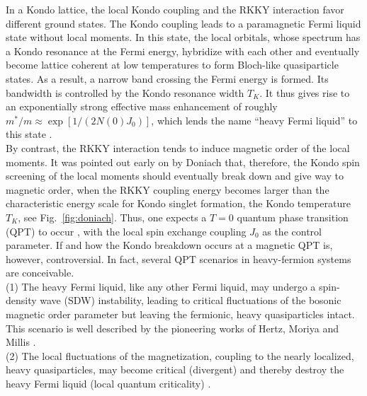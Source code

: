 \documentclass[12pt,twoside]{article}
\begin{document}
In a Kondo lattice, the local Kondo coupling and the 
RKKY interaction favor different ground states. 
The Kondo coupling leads to a paramagnetic Fermi liquid state without 
local moments. In this state, 
the local orbitals, whose spectrum has a Kondo resonance at the 
Fermi energy, hybridize with each other and eventually become lattice 
coherent at low temperatures to form Bloch-like quasiparticle states. 
As a result, a narrow band crossing the Fermi energy is formed. 
Its bandwidth is controlled by the Kondo resonance width $T_K$. It thus
gives rise to an exponentially strong effective mass enhancement of 
roughly $m^*/m\approx \exp [1/(2N(0)J_0)]$, which lends the name 
``heavy Fermi liquid'' to this state \cite{Loehneysen07}.\\
By contrast, the RKKY interaction tends to induce magnetic order
of the local moments. It was pointed out early on by Doniach  
\cite{Doniach77} that, therefore, the Kondo spin screening of 
the local moments should eventually break down 
and give way to magnetic order,
when the RKKY coupling energy becomes larger than the characteristic energy 
scale for Kondo singlet formation, the Kondo temperature $T_K$, 
see Fig.~\ref{fig:doniach}. Thus, one expects a  $T=0$ quantum phase transition 
(QPT) to occur \cite{Loehneysen07}, with the local spin exchange 
coupling $J_0$ as the control parameter. 
If and how the Kondo breakdown occurs at a magnetic QPT is, 
however, controversial. In fact, several QPT scenarios in heavy-fermion 
systems are conceivable.\\ 
(1) The heavy Fermi liquid, like any other Fermi liquid, may undergo a 
spin-density wave (SDW) instability, leading to critical fluctuations of the 
bosonic magnetic order parameter but leaving the fermionic, heavy 
quasiparticles intact. This scenario is well described by the pioneering 
works of Hertz, Moriya and Millis \cite{Hertz76,Moriya85,Millis93}.\\ 
(2) The local fluctuations of the magnetization, coupling to the nearly 
localized, heavy quasiparticles, may become critical (divergent) and 
thereby destroy the heavy Fermi liquid (local quantum criticality)
\cite{Si01,Coleman01}.\\
\end{document}
